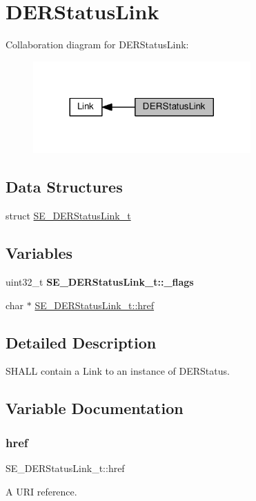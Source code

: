 \hypertarget{group__DERStatusLink}{}\section{D\+E\+R\+Status\+Link}
\label{group__DERStatusLink}
Collaboration diagram for D\+E\+R\+Status\+Link\+:\nopagebreak
\begin{figure}[H]
\begin{center}
\leavevmode
\includegraphics[width=236pt]{group__DERStatusLink}
\end{center}
\end{figure}
\subsection*{Data Structures}
\begin{DoxyCompactItemize}
\item 
struct \hyperlink{structSE__DERStatusLink__t}{S\+E\+\_\+\+D\+E\+R\+Status\+Link\+\_\+t}
\end{DoxyCompactItemize}
\subsection*{Variables}
\begin{DoxyCompactItemize}
\item 
\mbox{\label{group__DERStatusLink_gaa36207aca8bea5ced0089e1a87a3b5c7}} 
uint32\+\_\+t {\bfseries S\+E\+\_\+\+D\+E\+R\+Status\+Link\+\_\+t\+::\+\_\+flags}
\item 
char $\ast$ \hyperlink{group__DERStatusLink_gab9af51bb715d8cc4ee56d55d62641657}{S\+E\+\_\+\+D\+E\+R\+Status\+Link\+\_\+t\+::href}
\end{DoxyCompactItemize}


\subsection{Detailed Description}
S\+H\+A\+LL contain a Link to an instance of D\+E\+R\+Status. 

\subsection{Variable Documentation}
\mbox{\label{group__DERStatusLink_gab9af51bb715d8cc4ee56d55d62641657}} 
\subsubsection{\texorpdfstring{href}{href}}
{\footnotesize\ttfamily S\+E\+\_\+\+D\+E\+R\+Status\+Link\+\_\+t\+::href}

A U\+RI reference. 